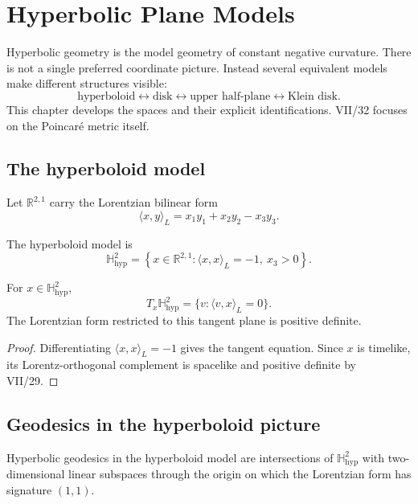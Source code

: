 \chapter{Hyperbolic Plane Models}
\label{ch:vii31-hyperbolic-models}

Hyperbolic geometry is the model geometry of constant negative curvature.  There is
not a single preferred coordinate picture.  Instead several equivalent models
make different structures visible:
\[
\boxed{
\text{hyperboloid}
\longleftrightarrow
\text{disk}
\longleftrightarrow
\text{upper half-plane}
\longleftrightarrow
\text{Klein disk}.
}
\]
This chapter develops the spaces and their explicit identifications.  VII/32
focuses on the Poincaré metric itself.

\section{The hyperboloid model}

Let \(\mathbb R^{2,1}\) carry the Lorentzian bilinear form
\[
\langle x,y\rangle_L
=
x_1y_1+x_2y_2-x_3y_3.
\]

\begin{definition}\label{def:vii31-hyperboloid}
The hyperboloid model is
\[
\mathbb H^2_{\mathrm{hyp}}
=
\left\{
x\in\mathbb R^{2,1}:
\langle x,x\rangle_L=-1,\ x_3>0
\right\}.
\]
\end{definition}

\begin{proposition}\label{prop:vii31-positive-tangent}
For \(x\in\mathbb H^2_{\mathrm{hyp}}\),
\[
T_x\mathbb H^2_{\mathrm{hyp}}
=
\{v:\langle v,x\rangle_L=0\}.
\]
The Lorentzian form restricted to this tangent plane is positive definite.
\end{proposition}

\begin{proof}
Differentiating \(\langle x,x\rangle_L=-1\) gives the tangent equation.  Since
\(x\) is timelike, its Lorentz-orthogonal complement is spacelike and positive
definite by VII/29.
\end{proof}

\section{Geodesics in the hyperboloid picture}

\begin{proposition}\label{prop:vii31-hyp-geodesics}
Hyperbolic geodesics in the hyperboloid model are intersections of
\(\mathbb H^2_{\mathrm{hyp}}\) with two-dimensional linear subspaces through the
origin on which the Lorentzian form has signature \((1,1)\).
\end{proposition}

